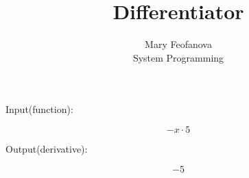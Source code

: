 \documentclass[12pt]{article}
\begin{document}
\title{Differentiator}
\author{Mary Feofanova\\
System Programming}
 
\maketitle
\begin{center}
Input(function):
\end{center}
$$-x \cdot 5$$
\begin{center}
Output(derivative):
\end{center}
$$-5$$
\end{document}
